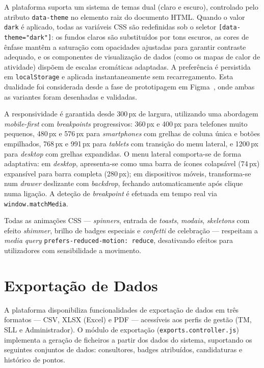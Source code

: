 \documentclass[12pt,a4paper]{report}
\begin{document}
A plataforma suporta um sistema de temas dual (claro e escuro), controlado pelo atributo \texttt{data-theme} no elemento raiz do documento HTML. Quando o valor \texttt{dark} é aplicado, todas as variáveis CSS são redefinidas sob o seletor \texttt{[data-theme="dark"]}: os fundos claros são substituídos por tons escuros, as cores de ênfase mantêm a saturação com opacidades ajustadas para garantir contraste adequado, e os componentes de visualização de dados (como os mapas de calor de atividade) dispõem de escalas cromáticas adaptadas. A preferência é persistida em \texttt{localStorage} e aplicada instantaneamente sem recarregamento. Esta dualidade foi considerada desde a fase de prototipagem em Figma~\cite{figma}, onde ambas as variantes foram desenhadas e validadas.

A responsividade é garantida desde 300\,px de largura, utilizando uma abordagem \textit{mobile-first} com \textit{breakpoints} progressivos: 360\,px e 400\,px para telefones muito pequenos, 480\,px e 576\,px para \textit{smartphones} com grelhas de coluna única e botões empilhados, 768\,px e 991\,px para \textit{tablets} com transição do menu lateral, e 1200\,px para \textit{desktop} com grelhas expandidas. O menu lateral comporta-se de forma adaptativa: em \textit{desktop}, apresenta-se como uma barra de ícones colapsável (74\,px) expansível para barra completa (280\,px); em dispositivos móveis, transforma-se num \textit{drawer} deslizante com \textit{backdrop}, fechando automaticamente após clique numa ligação. A deteção de \textit{breakpoint} é efetuada em tempo real via \texttt{window.matchMedia}.

Todas as animações CSS --- \textit{spinners}, entrada de \textit{toasts}, \textit{modais}, \textit{skeletons} com efeito \textit{shimmer}, brilho de badges especiais e \textit{confetti} de celebração --- respeitam a \textit{media query} \texttt{prefers-reduced-motion: reduce}, desativando efeitos para utilizadores com sensibilidade a movimento.

\section{Exportação de Dados}

A plataforma disponibiliza funcionalidades de exportação de dados em três formatos --- CSV, XLSX (Excel) e PDF --- acessíveis aos perfis de gestão (TM, SLL e Administrador). O módulo de exportação (\texttt{exports.controller.js}) implementa a geração de ficheiros a partir dos dados do sistema, suportando os seguintes conjuntos de dados: consultores, badges atribuídos, candidaturas e histórico de pontos.
\end{document}
